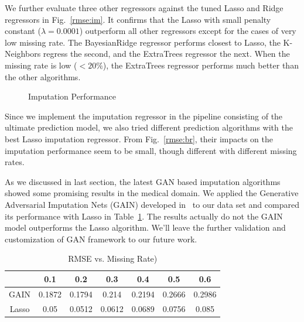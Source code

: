 We further evaluate three other regressors against the tuned Lasso and Ridge regressors in Fig.~\ref{rmse:im}. It confirms that the Lasso with small 
penalty constant ($\lambda = 0.0001$) outperform all other regressors except for the cases of very low missing rate. The BayesianRidge regressor performs 
closest to Lasso, the K-Neighbors regress the second, and the ExtraTrees regressor the next. When the missing rate is low ($<20\%$), the ExtraTrees regressor 
performs much better than the other algorithms.

  \begin{figure}[!ht]
    \hfill
    \caption{Imputation Performance}
    \label{fig:rmse}
  \end{figure}

Since we implement the imputation regressor in the pipeline consisting of the ultimate prediction model, we also tried different prediction algorithms 
with the best Lasso imputation regressor. From Fig.~\ref{rmse:br}, their impacts on the imputation performance seem to be small, though different 
with different missing rates.
 
As we discussed in last section, the latest GAN based imputation algorithms showed some promising results in the medical domain. 
We applied the Generative Adversarial Imputation Nets (GAIN) developed in~\cite{Yoon2018GAINMD} to our data set and compared its performance 
with Lasso in Table~\ref{tab:gain}. The results actually do not the GAIN model outperforms the Lasso algorithm. We'll leave the further validation and 
customization of GAN framework to our future work.
  
 \begin{table}[!ht]
\caption{RMSE vs. Missing Rate) }
\label{tab:gain}
\begin{center}
\begin{tabular}{ |c|c|c|c|c|c|c| } 
 \hline
  & 0.1 & 0.2 & 0.3 & 0.4 & 0.5 & 0.6\\ 
 \hline
  \hline
 GAIN & 0.1872 & 0.1794 & 0.214 & 0.2194 & 0.2666 & 0.2986 \\ 
 \hline
 Lasso & 0.05 & 0.0512 & 0.0612 & 0.0689 &0.0756 & 0.085\\
 \hline
\end{tabular}
\end{center}
\end{table} 

